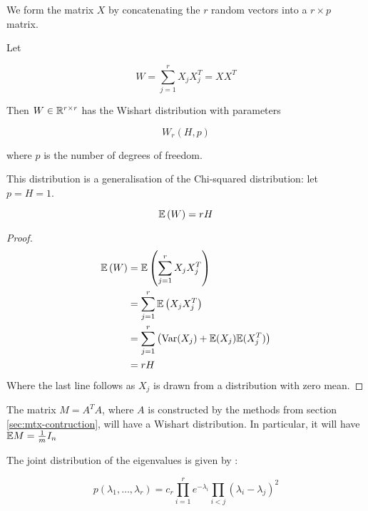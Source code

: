 We form the matrix \(X\) by concatenating the \(r\) random vectors into a \(r \times p\) matrix.

\begin{definition}
Let 

\begin{equation}
W = \sum_{j=1}^r X_j X_j^T =  X X^T
\end{equation}

Then \(W \in {\mathbb{R}}^{r \times r}\) has the Wishart distribution with parameters 

\begin{equation}
W_r\left(H, p\right)
\end{equation}

where \(p\) is the number of degrees of freedom.
\end{definition}

\begin{remark}
This distribution is a generalisation of the Chi-squared distribution: let \(p = H = 1\). 
\end{remark}

\begin{theorem}
\begin{equation}
{\mathbb{E}}\left(W\right) = rH
\end{equation}
\end{theorem}
\begin{proof}
\begin{align*}
{\mathbb{E}}\left(W\right) &= {\mathbb{E}}\left(\sum_{j=1}^r X_j X_j^T\right) \\
&= \sum_{j=1}^r {\mathbb{E}}\left(X_jX_j^T\right) \\
&= \sum_{j=1}^r \left( \mathrm{Var}(X_j) + {\mathbb{E}}(X_j) {\mathbb{E}}(X_j^T)   \right) \\
&= rH 
\end{align*}
Where the last line follows as \(X_j\) is drawn from a distribution with zero mean.
\end{proof}

\begin{remark}
The matrix \(M = A^TA\), where \(A\) is constructed by the methods from section \ref{sec:mtx-contruction}, will have a Wishart distribution. In particular, it will have \({\mathbb{E}} M = \frac{1}{m}I_n\) 
\label{remark: exp AtA}
\end{remark}

The joint distribution of the eigenvalues is given by \cite{levequeMatrices}:

\begin{equation}
p\left(\lambda_1, \ldots, \lambda_r\right) = c_r \prod_{i=1}^r e^{-\lambda_i}\prod_{i<j}\left(\lambda_i - \lambda_j\right)^2
\end{equation}

